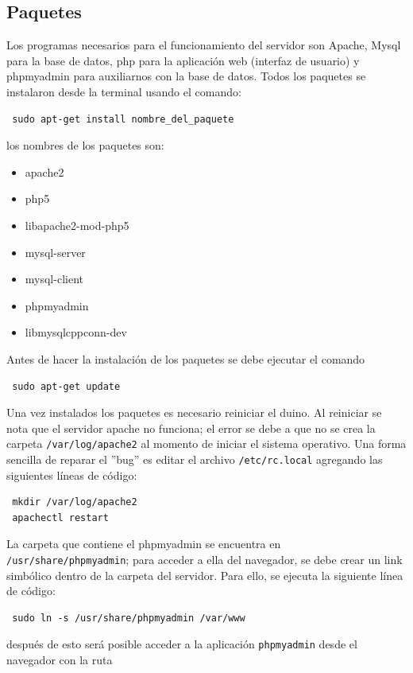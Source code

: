 \documentclass[10pt,twocolumn]{article}
\begin{document}
\subsection{Paquetes}
Los programas necesarios 
para el funcionamiento del servidor son Apache, Mysql para la base de datos, 
php para la aplicaci\'on web (interfaz de usuario) y phpmyadmin para auxiliarnos con la base de 
datos. 
Todos los paquetes se instalaron desde la terminal usando el comando:
\begin{verbatim}
 sudo apt-get install nombre_del_paquete
\end{verbatim}
los nombres de los paquetes son:
\begin{itemize}
\item apache2
\item php5
\item libapache2-mod-php5
\item mysql-server 
\item mysql-client
\item phpmyadmin 
\item libmysqlcppconn-dev 
\end{itemize}

Antes de hacer la instalaci\'on de los paquetes se debe ejecutar el comando

\begin{verbatim}
 sudo apt-get update
\end{verbatim}

Una vez instalados los paquetes es necesario reiniciar el duino. Al reiniciar se nota que el servidor apache no 
funciona; el error se debe a que no se crea la carpeta \verb|/var/log/apache2| al momento 
de iniciar el sistema operativo. Una forma sencilla de reparar el ''bug'' es editar el archivo \verb|/etc/rc.local| 
agregando las siguientes l\'ineas de c\'odigo:

\begin{verbatim}
 mkdir /var/log/apache2
 apachectl restart
\end{verbatim}

La carpeta que contiene el 
phpmyadmin se encuentra en \verb|/usr/share/phpmyadmin|; para acceder a ella del navegador, se debe 
crear un link simb\'olico dentro de la carpeta del servidor. Para ello, se ejecuta la 
siguiente l\'inea 
de c\'odigo:
\begin{verbatim}
 sudo ln -s /usr/share/phpmyadmin /var/www
\end{verbatim}

despu\'es de esto ser\'a posible acceder a la aplicaci\'on \verb|phpmyadmin| desde el navegador con la ruta
\end{document}
